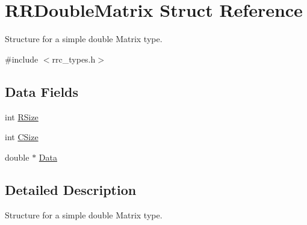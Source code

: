 \hypertarget{struct_r_r_double_matrix}{\section{R\-R\-Double\-Matrix Struct Reference}
\label{struct_r_r_double_matrix}
}


Structure for a simple double Matrix type.  




{\ttfamily \#include $<$rrc\-\_\-types.\-h$>$}

\subsection*{Data Fields}
\begin{DoxyCompactItemize}
\item 
int \hyperlink{struct_r_r_double_matrix_a4d8512c879223c0e0d1522dae38e7819}{R\-Size}
\item 
int \hyperlink{struct_r_r_double_matrix_a17c9a5894aa9cb3789346dcaa9c370bb}{C\-Size}
\item 
double $\ast$ \hyperlink{struct_r_r_double_matrix_a7c5cbda3aa940f4b0d6e8a1679307dfc}{Data}
\end{DoxyCompactItemize}


\subsection{Detailed Description}
Structure for a simple double Matrix type. 


